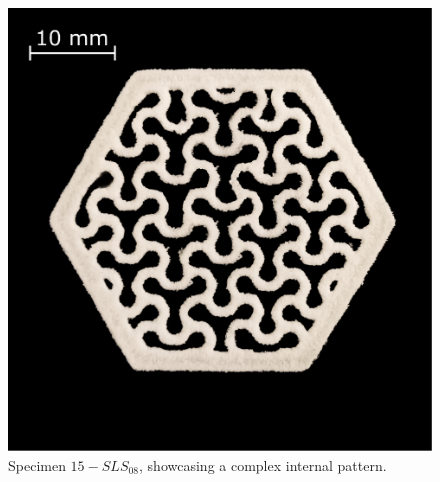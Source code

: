 \documentclass{article}
\begin{document}
        \begin{figure}[ht]
            \centering
            \includegraphics[width=\textwidth]{Pictures/Printed_parts/Fixed/organic_pattern_hexagon.eps}
            \caption{Specimen $15-SLS_{08}$, showcasing a complex internal pattern.}
            \label{fig:printed_specimens_organicpattern}
        \end{figure}
\end{document}
